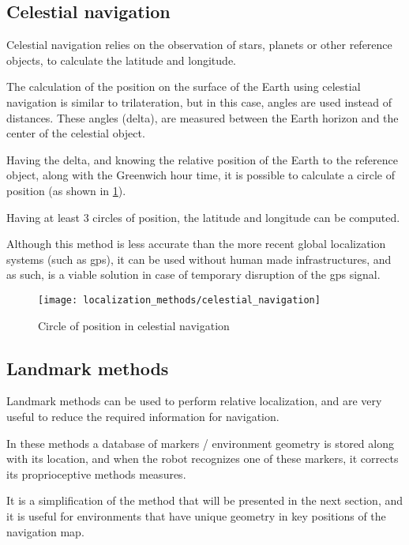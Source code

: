 \subsection{Celestial navigation}

Celestial navigation \cite{Yang2011} relies on the observation of stars, planets or other reference objects, to calculate the latitude and longitude.

The calculation of the position on the surface of the Earth using celestial navigation is similar to trilateration, but in this case, angles are used instead of distances. These angles (delta), are measured between the Earth horizon and the center of the celestial object.

Having the delta, and knowing the relative position of the Earth to the reference object, along with the Greenwich hour time, it is possible to calculate a circle of position (as shown in \cref{fig:localization-methods_celestial-navigation}).

Having at least 3 circles of position, the latitude and longitude can be computed.

Although this method is less accurate than the more recent global localization systems (such as \gls{gps}), it can be used without human made infrastructures, and as such, is a viable solution in case of temporary disruption of the \gls{gps} signal.

\begin{figure}[H]
	\centering
	\texttt{[image: localization\_methods/celestial\_navigation]}
	\caption{Circle of position in celestial navigation\protect\footnotemark}
	\label{fig:localization-methods_celestial-navigation}
\end{figure}


\subsection{Landmark methods}

Landmark methods \cite{Lee2006} can be used to perform relative localization, and are very useful to reduce the required information for navigation.

In these methods a database of markers / environment geometry is stored along with its location, and when the robot recognizes one of these markers, it corrects its proprioceptive methods measures.

It is a simplification of the method that will be presented in the next section, and it is useful for environments that have unique geometry in key positions of the navigation map.


